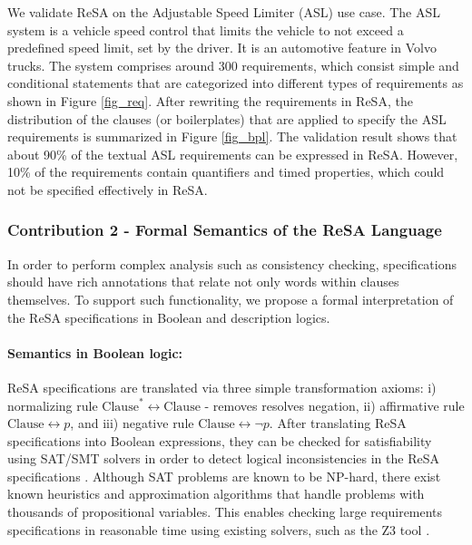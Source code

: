 We validate ReSA on the Adjustable Speed Limiter (ASL) use case. The ASL system is a vehicle speed control that limits the vehicle to not exceed a predefined speed limit, set by the driver. It is an automotive feature in Volvo trucks. The system comprises around 300 requirements, which consist simple and conditional statements that are categorized into different types of requirements as shown in Figure \ref{fig_req}. After rewriting the requirements in ReSA, the distribution of the clauses (or boilerplates) that are applied to specify the ASL requirements is summarized in Figure \ref{fig_bpl}. The validation result shows that about 90\% of the textual ASL requirements can be expressed in ReSA. However, 10\% of the requirements contain quantifiers and timed properties, which could not be specified effectively in ReSA.

\subsubsection{Contribution 2 - Formal Semantics of the ReSA Language}
In order to perform complex analysis such as consistency checking, specifications should have rich annotations that relate not only words within clauses themselves. To support such functionality, we propose a formal interpretation of the ReSA specifications in Boolean and description logics.

\paragraph{Semantics in Boolean logic: } ReSA specifications are translated via three simple transformation axioms: i) normalizing rule $\mathrm{Clause}^*\leftrightarrow \mathrm{Clause}$ - removes resolves negation, ii) affirmative rule $\mathrm{Clause}\leftrightarrow p$, and  iii) negative rule $\mathrm{Clause}\leftrightarrow \neg p$. After translating ReSA specifications into Boolean expressions, they can be checked for satisfiability using SAT/SMT solvers in order to detect logical inconsistencies in the ReSA specifications \cite{Mahmud2015ReSA:Systems,resatool}. Although SAT problems are known to be NP-hard, there exist known heuristics and approximation algorithms that handle problems with thousands of propositional variables. This enables checking large requirements specifications in reasonable time using existing solvers, such as the Z3 tool \cite{DeMoura2008Z3:Solver}. 

